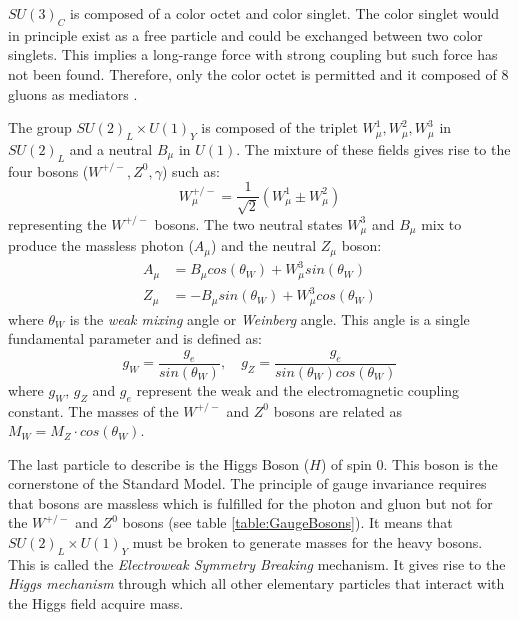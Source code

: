 $SU(3)_{C}$ is composed of a color octet and color singlet. The color singlet would in principle exist as a free particle and could be exchanged between two color singlets. This implies a long-range force with strong coupling but such force has not been found. Therefore, only the color octet is permitted and it composed of 8 gluons as mediators \cite{Griffiths:343277}.

The group $SU(2)_{L} \times U(1)_{Y}$ is composed of the triplet $W_{\mu}^1, W_{\mu}^2, W_{\mu}^3$ in $SU(2)_{L}$ and a neutral $B_{\mu}$ in $U(1)$. The mixture of these fields gives rise to the four bosons ($W^{+/-}, Z^0, \gamma$) such as:
\begin{equation}
  W_{\mu}^{+/-} = \frac{1}{\sqrt{2}}(W_{\mu}^1 \pm W_{\mu}^2)
\end{equation}
representing the $W^{+/-}$ bosons. The two neutral states $W_{\mu}^3$ and $B_{\mu}$ mix to produce the massless photon ($A_{\mu}$) and the neutral $Z_{\mu}$ boson:
\begin{equation}
  \begin{aligned}
    A_{\mu} &= B_{\mu} cos(\theta_W) + W_{\mu}^3 sin(\theta_W)\\
    Z_{\mu} &= - B_{\mu} sin(\theta_W) + W_{\mu}^3 cos(\theta_W)
  \end{aligned}
\end{equation}
where $\theta_W$ is the \textit{weak mixing} angle or \textit{Weinberg} angle. This angle is a single fundamental parameter and is defined as:
\begin{equation}
  g_W = \frac{g_e}{sin(\theta_W)}, \quad g_Z = \frac{g_e}{sin(\theta_W) cos(\theta_W)}
\end{equation}
where $g_W$, $g_Z$ and $g_e$ represent the weak and the electromagnetic coupling constant. The masses of the $W^{+/-}$ and $Z^0$ bosons are related as $M_W = M_Z \cdot cos(\theta_W)$.

The last particle to describe is the Higgs Boson ($H$) of spin 0. This boson is the cornerstone of the Standard Model. The principle of gauge invariance requires that bosons are massless which is fulfilled for the photon and gluon but not for the $W^{+/-}$ and $Z^0$ bosons (see table \ref{table:GaugeBosons}). It means that $SU(2)_{L} \times U(1)_{Y}$ must be broken to generate masses for the heavy bosons. This is called the \textit{Electroweak Symmetry Breaking} mechanism. It gives rise to the \textit{Higgs mechanism} through which all other elementary particles that interact with the Higgs field acquire mass.

